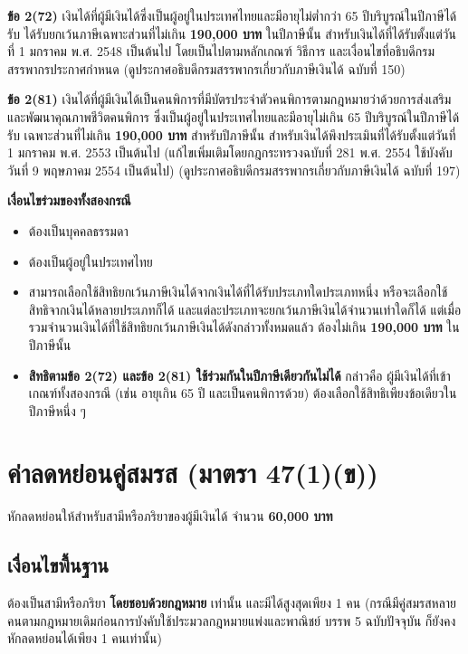 \documentclass[12pt,a4paper]{article}
\newcommand{\hilight}[1]{\textbf{#1}}
\begin{document}
\textbf{ข้อ 2(72)} เงินได้ที่ผู้มีเงินได้ซึ่งเป็นผู้อยู่ในประเทศไทยและมีอายุไม่ต่ำกว่า 65 ปีบริบูรณ์ในปีภาษีได้รับ ได้รับยกเว้นภาษีเฉพาะส่วนที่ไม่เกิน \hilight{190,000 บาท} ในปีภาษีนั้น สำหรับเงินได้ที่ได้รับตั้งแต่วันที่ 1 มกราคม พ.ศ. 2548 เป็นต้นไป โดยเป็นไปตามหลักเกณฑ์ วิธีการ และเงื่อนไขที่อธิบดีกรมสรรพากรประกาศกำหนด (ดูประกาศอธิบดีกรมสรรพากรเกี่ยวกับภาษีเงินได้ ฉบับที่ 150)

\textbf{ข้อ 2(81)} เงินได้ที่ผู้มีเงินได้เป็นคนพิการที่มีบัตรประจำตัวคนพิการตามกฎหมายว่าด้วยการส่งเสริมและพัฒนาคุณภาพชีวิตคนพิการ ซึ่งเป็นผู้อยู่ในประเทศไทยและมีอายุไม่เกิน 65 ปีบริบูรณ์ในปีภาษีได้รับ เฉพาะส่วนที่ไม่เกิน \hilight{190,000 บาท} สำหรับปีภาษีนั้น สำหรับเงินได้พึงประเมินที่ได้รับตั้งแต่วันที่ 1 มกราคม พ.ศ. 2553 เป็นต้นไป (แก้ไขเพิ่มเติมโดยกฎกระทรวงฉบับที่ 281 พ.ศ. 2554 ใช้บังคับวันที่ 9 พฤษภาคม 2554 เป็นต้นไป) (ดูประกาศอธิบดีกรมสรรพากรเกี่ยวกับภาษีเงินได้ ฉบับที่ 197)

\textbf{เงื่อนไขร่วมของทั้งสองกรณี}

\begin{itemize}
    \item ต้องเป็นบุคคลธรรมดา
    \item ต้องเป็นผู้อยู่ในประเทศไทย
    \item สามารถเลือกใช้สิทธิยกเว้นภาษีเงินได้จากเงินได้ที่ได้รับประเภทใดประเภทหนึ่ง หรือจะเลือกใช้สิทธิจากเงินได้หลายประเภทก็ได้ และแต่ละประเภทจะยกเว้นภาษีเงินได้จำนวนเท่าใดก็ได้ แต่เมื่อรวมจำนวนเงินได้ที่ใช้สิทธิยกเว้นภาษีเงินได้ดังกล่าวทั้งหมดแล้ว ต้องไม่เกิน \hilight{190,000 บาท} ในปีภาษีนั้น
    \item \hilight{สิทธิตามข้อ 2(72) และข้อ 2(81) ใช้ร่วมกันในปีภาษีเดียวกันไม่ได้} กล่าวคือ ผู้มีเงินได้ที่เข้าเกณฑ์ทั้งสองกรณี (เช่น อายุเกิน 65 ปี และเป็นคนพิการด้วย) ต้องเลือกใช้สิทธิเพียงข้อเดียวในปีภาษีหนึ่ง ๆ
\end{itemize}

\newpage
\section{ค่าลดหย่อนคู่สมรส (มาตรา 47(1)(ข))}

หักลดหย่อนให้สำหรับสามีหรือภริยาของผู้มีเงินได้ จำนวน \hilight{60,000 บาท}

\subsection*{เงื่อนไขพื้นฐาน}

ต้องเป็นสามีหรือภริยา \hilight{โดยชอบด้วยกฎหมาย} เท่านั้น และมีได้สูงสุดเพียง 1 คน (กรณีมีคู่สมรสหลายคนตามกฎหมายเดิมก่อนการบังคับใช้ประมวลกฎหมายแพ่งและพาณิชย์ บรรพ 5 ฉบับปัจจุบัน ก็ยังคงหักลดหย่อนได้เพียง 1 คนเท่านั้น)
\end{document}
